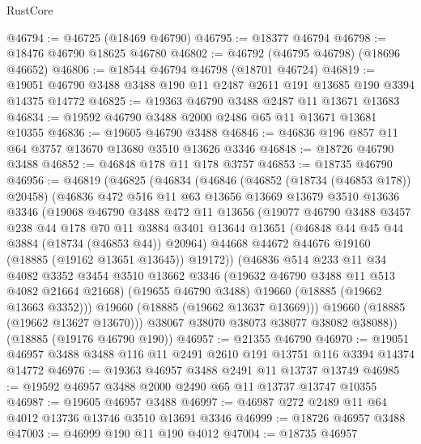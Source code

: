 \begin{lexlean}{RustCore}
\begin{coremodule}
@46794 := @46725 (@18469 @46790)
@46795 := @18377 @46794
@46798 := @18476 @46790 @18625 @46780
@46802 := @46792 (@46795 @46798) (@18696 @46652)
@46806 := @18544 @46794 @46798 (@18701 @46724)
@46819 := @19051 @46790 @3488 @3488 @190 @11 @2487 @2611 @191 @13685 @190 @3394 @14375 @14772
@46825 := @19363 @46790 @3488 @2487 @11 @13671 @13683
@46834 := @19592 @46790 @3488 @2000 @2486 @65 @11 @13671 @13681 @10355
@46836 := @19605 @46790 @3488
@46846 := @46836 @196 @857 @11 @64 @3757 @13670 @13680 @3510 @13626 @3346
@46848 := @18726 @46790 @3488
@46852 := @46848 @178 @11 @178 @3757
@46853 := @18735 @46790
@46956 := @46819
    (@46825
      (@46834
        (@46846
          (@46852 (@18734 (@46853 @178)) @20458)
          (@46836
            @472
            @516
            @11
            @63
            @13656
            @13669
            @13679
            @3510
            @13636
            @3346
            (@19068
              @46790
              @3488
              @472
              @11
              @13656
              (@19077
                @46790
                @3488
                @3457
                @238
                @44
                @178
                @70
                @11
                @3884
                @3401
                @13644
                @13651
                (@46848 @44 @45 @44 @3884 (@18734 (@46853 @44)) @20964)
                @44668
                @44672
                @44676
                @19160
                (@18885 (@19162 @13651 @13645))
                @19172))
            (@46836
              @514
              @233
              @11
              @34
              @4082
              @3352
              @3454
              @3510
              @13662
              @3346
              (@19632 @46790 @3488 @11 @513 @4082 @21664 @21668)
              (@19655 @46790 @3488)
              @19660
              (@18885 (@19662 @13663 @3352)))
            @19660
            (@18885 (@19662 @13637 @13669)))
          @19660
          (@18885 (@19662 @13627 @13670)))
        @38067
        @38070
        @38073
        @38077
        @38082
        @38088))
    (@18885 (@19176 @46790 @190))
@46957 := @21355 @46790
@46970 := @19051 @46957 @3488 @3488 @116 @11 @2491 @2610 @191 @13751 @116 @3394 @14374 @14772
@46976 := @19363 @46957 @3488 @2491 @11 @13737 @13749
@46985 := @19592 @46957 @3488 @2000 @2490 @65 @11 @13737 @13747 @10355
@46987 := @19605 @46957 @3488
@46997 := @46987 @272 @2489 @11 @64 @4012 @13736 @13746 @3510 @13691 @3346
@46999 := @18726 @46957 @3488
@47003 := @46999 @190 @11 @190 @4012
@47004 := @18735 @46957

\end{coremodule}
\end{lexlean}
